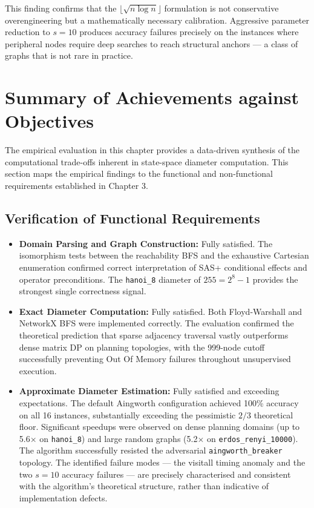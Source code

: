 This finding confirms that the $\lfloor\sqrt{n \log n}\rfloor$ formulation is not conservative overengineering but a mathematically necessary calibration. Aggressive parameter reduction to $s = 10$ produces accuracy failures precisely on the instances where peripheral nodes require deep searches to reach structural anchors --- a class of graphs that is not rare in practice.

\section{Summary of Achievements against Objectives}

The empirical evaluation in this chapter provides a data-driven synthesis of the computational trade-offs inherent in state-space diameter computation. This section maps the empirical findings to the functional and non-functional requirements established in Chapter 3.

\subsection{Verification of Functional Requirements}

\begin{itemize}
    \item \textbf{Domain Parsing and Graph Construction:} Fully satisfied. The isomorphism tests between the reachability BFS and the exhaustive Cartesian enumeration confirmed correct interpretation of SAS+ conditional effects and operator preconditions. The \texttt{hanoi\_8} diameter of $255 = 2^8 - 1$ provides the strongest single correctness signal.

    \item \textbf{Exact Diameter Computation:} Fully satisfied. Both Floyd-Warshall and NetworkX BFS were implemented correctly. The evaluation confirmed the theoretical prediction that sparse adjacency traversal vastly outperforms dense matrix DP on planning topologies, with the 999-node cutoff successfully preventing Out Of Memory failures throughout unsupervised execution.

    \item \textbf{Approximate Diameter Estimation:} Fully satisfied and exceeding expectations. The default Aingworth configuration achieved 100\% accuracy on all 16 instances, substantially exceeding the pessimistic $2/3$ theoretical floor. Significant speedups were observed on dense planning domains (up to 5.6$\times$ on \texttt{hanoi\_8}) and large random graphs (5.2$\times$ on \texttt{erdos\_renyi\_10000}). The algorithm successfully resisted the adversarial \texttt{aingworth\_breaker} topology. The identified failure modes --- the visitall timing anomaly and the two $s = 10$ accuracy failures --- are precisely characterised and consistent with the algorithm's theoretical structure, rather than indicative of implementation defects.
\end{itemize}

